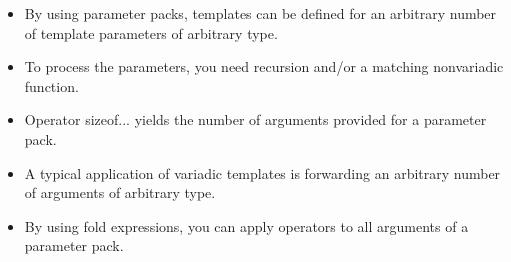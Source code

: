 
\begin{itemize}
\item 
By using parameter packs, templates can be defined for an arbitrary number of template parameters of arbitrary type.

\item 
To process the parameters, you need recursion and/or a matching nonvariadic function.

\item 
Operator sizeof... yields the number of arguments provided for a parameter pack.

\item 
A typical application of variadic templates is forwarding an arbitrary number of arguments of arbitrary type.

\item 
By using fold expressions, you can apply operators to all arguments of a parameter pack.
\end{itemize}